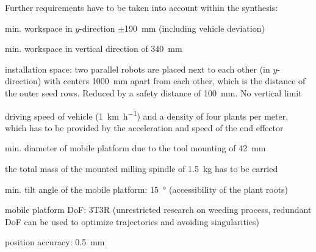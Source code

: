 \documentclass[runningheads]{llncs}
\begin{document}
Further requirements have to be taken into account within the synthesis:
\begin{compactitem}
    \item min. workspace in $y$-direction $\pm$\SI{190}{\mm} (including vehicle deviation)%
    \item min. workspace in vertical direction of \SI{340}{\mm}%
    \item installation space: two parallel robots are placed next to each other (in $y$-direction) with centers \SI{1000}{\milli\metre} apart from each other, which is the distance of the outer seed rows. Reduced by a safety distance of \SI{100}{\milli\metre}. No vertical limit
    \item driving speed of vehicle (\SI{1}{\km\per\hour}) and a density of four plants per meter, which has to be provided by the acceleration and speed of the end effector%
    \item min. diameter of mobile platform due to the tool mounting of \SI{42}{\mm}
    \item the total mass of the mounted milling spindle of \SI{1.5}{\kg} has to be carried
    \item min. tilt angle of the mobile platform: \SI{15}{\degree} (accessibility of the plant roots) 
    \item mobile platform DoF: 3T3R (unrestricted research on weeding process, redundant DoF can be used to optimize trajectories and avoiding singularities)
    \item position accuracy: \SI{0.5}{\mm}
\end{compactitem}
\end{document}
